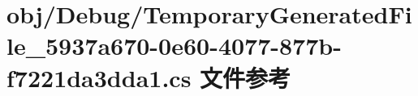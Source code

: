\hypertarget{_temporary_generated_file__5937a670-0e60-4077-877b-f7221da3dda1_8cs}{}\section{obj/\+Debug/\+Temporary\+Generated\+File\+\_\+5937a670-\/0e60-\/4077-\/877b-\/f7221da3dda1.cs 文件参考}
\label{_temporary_generated_file__5937a670-0e60-4077-877b-f7221da3dda1_8cs}
